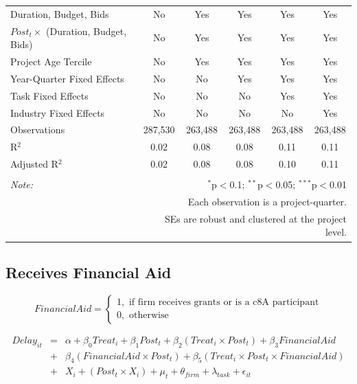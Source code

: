 \documentclass[
]{article}
\begin{document}
\begin{table}[H]
\begin{tabular}{@{\extracolsep{-2pt}}lccccc}
Duration, Budget, Bids & No & Yes & Yes & Yes & Yes \\ 
$Post_t \times $  (Duration, Budget, Bids) & No & Yes & Yes & Yes & Yes \\ 
Project Age Tercile & No & Yes & Yes & Yes & Yes \\ 
Year-Quarter Fixed Effects & No & No & Yes & Yes & Yes \\ 
Task Fixed Effects & No & No & No & Yes & Yes \\ 
Industry Fixed Effects & No & No & No & No & Yes \\ 
Observations & 287,530 & 263,488 & 263,488 & 263,488 & 263,488 \\ 
R$^{2}$ & 0.02 & 0.08 & 0.08 & 0.11 & 0.11 \\ 
Adjusted R$^{2}$ & 0.02 & 0.08 & 0.08 & 0.10 & 0.11 \\ 
\hline 
\hline \\[-1.8ex] 
\textit{Note:}  & \multicolumn{5}{r}{$^{*}$p$<$0.1; $^{**}$p$<$0.05; $^{***}$p$<$0.01} \\ 
 & \multicolumn{5}{r}{Each observation is a project-quarter.} \\ 
 & \multicolumn{5}{r}{SEs are robust and clustered at the project level.} \\ 
\end{tabular} 
\end{table}

\hypertarget{receives-financial-aid}{%
\subsection{Receives Financial Aid}\label{receives-financial-aid}}

\[ FinancialAid = \begin{cases} 1, \text{ if firm receives grants or is a c8A participant}\\
0, \text{ otherwise} \end{cases}\]

\[ \begin{aligned}
Delay_{it} &=& \alpha+\beta_0 Treat_i + \beta_1 Post_t + \beta_2 (Treat_i \times Post_t) +\beta_3 FinancialAid \\
&+& \beta_4 (FinancialAid \times Post_t) + \beta_5 (Treat_i \times Post_t \times FinancialAid) \\ 
&+&X_i + (Post_t \times X_i) + \mu_t + \theta_{firm} + \lambda_{task}+ \epsilon_{it}
\end{aligned}\]
\end{document}
